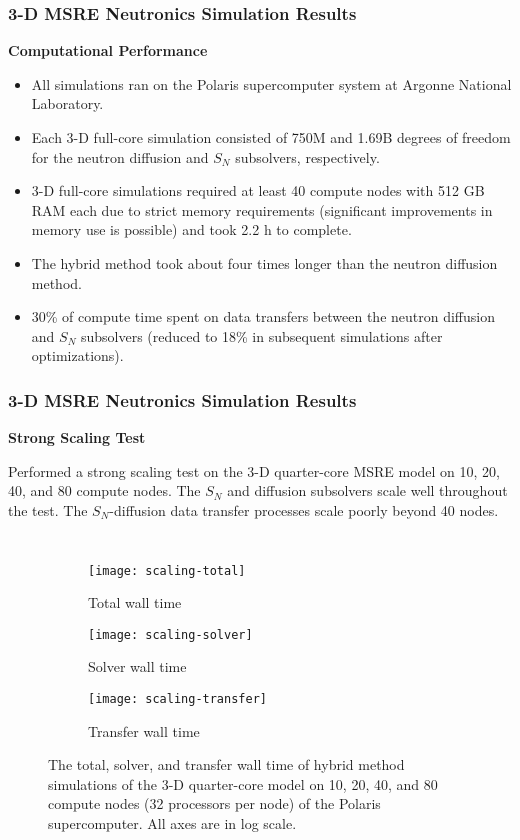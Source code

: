 \begin{frame}
  \frametitle{3-D MSRE Neutronics Simulation Results}
  \textbf{Computational Performance}
  \begin{itemize}
    \item All simulations ran on the Polaris supercomputer system at Argonne National Laboratory.
    \item Each 3-D full-core simulation consisted of 750M and 1.69B degrees of freedom for the
      neutron diffusion and $S_N$ subsolvers, respectively.
    \item 3-D full-core simulations required at least 40 compute nodes with 512 GB RAM each due to
      strict memory requirements (significant improvements in memory use is possible) and took 2.2
      h to complete.
    \item The hybrid method took about four times longer than the neutron diffusion method.
    \item 30\% of compute time spent on data transfers between the neutron diffusion and $S_N$
      subsolvers (reduced to 18\% in subsequent simulations after optimizations).
  \end{itemize}
\end{frame}

\begin{frame}
  \frametitle{3-D MSRE Neutronics Simulation Results}
  \textbf{Strong Scaling Test}
  \vspace{.2cm}

  Performed a strong scaling test on the 3-D quarter-core MSRE model on 10, 20, 40, and 80 compute
  nodes. The $S_N$ and diffusion subsolvers scale well throughout the test.
  The $S_N$-diffusion data transfer processes scale poorly beyond 40 nodes.
  \begin{columns}
  \column{11cm}
  \begin{figure}[t]
    \centering
    \begin{subfigure}[b]{0.32\columnwidth}
      \centering
      \texttt{[image: scaling-total]}
      \caption{Total wall time}
    \end{subfigure}
    \begin{subfigure}[b]{0.32\columnwidth}
      \centering
      \texttt{[image: scaling-solver]}
      \caption{Solver wall time}
    \end{subfigure}
    \begin{subfigure}[b]{0.32\columnwidth}
      \centering
      \texttt{[image: scaling-transfer]}
      \caption{Transfer wall time}
    \end{subfigure}
    \caption{The total, solver, and transfer wall time of hybrid method simulations of the 3-D
    quarter-core model on 10, 20, 40, and 80 compute nodes (32 processors per node) of the Polaris
    supercomputer. All axes are in log scale.}
    \label{fig:scaling}
  \end{figure}
\end{columns}
\end{frame}
